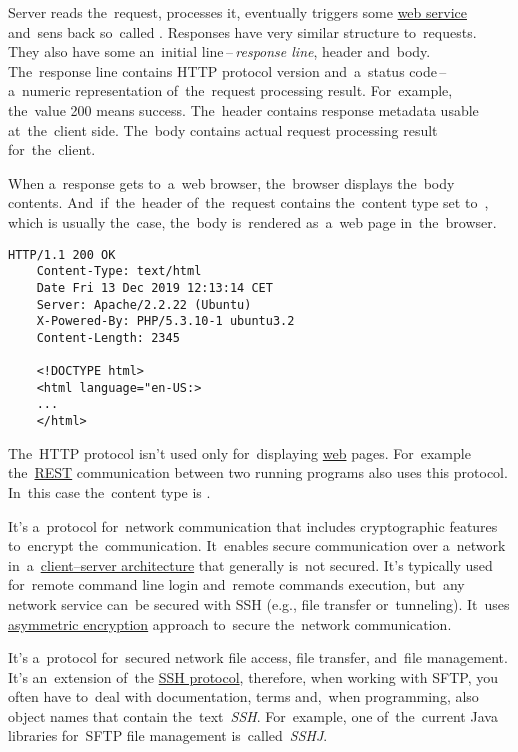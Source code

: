 Server reads the~request, processes it, eventually triggers some \hyperref[webserviceapplication]{web service} and~sens back so~called .
Responses have very similar structure to~requests.
They also have some an~initial line\,--\,\textit{response line}, header and~body.
The~response line contains HTTP protocol version and~a~status code\,--\, a~numeric representation of~the~request processing result.
For~example, the~value 200 means success.
The~header contains response metadata usable at~the~client side.
The~body contains actual request processing result for~the~client.

When a~response gets to~a~web browser, the~browser displays the~body contents.
And~if~the~header of~the~request contains the~content type set to~, which is usually the~case, the~body is~rendered as~a~web page in~the~browser.

\begin{lstlisting}[title={Example of a~HTTP response}]
    HTTP/1.1 200 OK
    Content-Type: text/html
    Date Fri 13 Dec 2019 12:13:14 CET
    Server: Apache/2.2.22 (Ubuntu)
    X-Powered-By: PHP/5.3.10-1 ubuntu3.2
    Content-Length: 2345

    <!DOCTYPE html>
    <html language="en-US:>
    ...
    </html>
\end{lstlisting}

\notenonl The~HTTP protocol isn't used only for~displaying \hyperref[internetweb]{web} pages.
For~example the~\hyperref[rest]{REST} communication between two running programs also uses this protocol.
In~this case the~content type is .

\label{https}

\label{smtp}

\label{ssh}
It's a~protocol for~network communication that includes cryptographic features to~encrypt the~communication.
It~enables secure communication over a~network in~a~\hyperref[clientserverarchitecture]{client--server architecture} that generally is~not secured.
It's typically used for~remote command line login and~remote commands execution, but~any network service can~be secured with SSH (e.g., file transfer or~tunneling).
It~uses \hyperref[asymmetricencryption]{asymmetric encryption} approach to~secure the~network communication.

\label{sftp}
It's a~protocol for~secured network file access, file transfer, and~file management.
It's an~extension of~the \hyperref[ssh]{SSH protocol}, therefore, when working with SFTP, you often have to~deal with documentation, terms and,~when programming, also object names that contain the~text~\textit{SSH}.
For~example, one of~the~current Java libraries for~SFTP file management is~called~\textit{SSHJ}.

